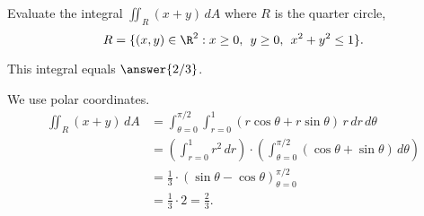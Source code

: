 \documentclass{ximera}
\author{Jim Fowler}
\begin{document}
\begin{exercise}
  Evaluate the integral $\displaystyle\iint_R \left(x + y\right) \, dA$ where $R$ is the quarter circle,
$$
R = \{ (x,y) \in \R^2 : x \geq 0,\hspace{1ex} y \geq 0,\hspace{1ex} x^2 + y^2 \leq 1 \}.
$$

This integral equals $\answer{2/3}$.

\begin{hint}
 We use polar coordinates.
 \begin{align*}
 \iint_R \left(x + y\right) \, dA
 &= \int_{\theta=0}^{\pi/2} \int_{r=0}^{1} (r \cos \theta + r \sin \theta) \, r \, dr \, d\theta \\  
 &= \left( \int_{r=0}^{1} r^2 \, dr \right) \cdot \left( \int_{\theta=0}^{\pi/2} (\cos \theta + \sin \theta) \, d\theta \right) \\  
 &= \frac{1}{3}  \cdot \left(\sin \theta - \cos \theta\right)_{\theta=0}^{\pi/2} \\
 &= \frac{1}{3}  \cdot 2 = \frac{2}{3}.
 \end{align*}
\end{hint}

\end{exercise}
\end{document}
